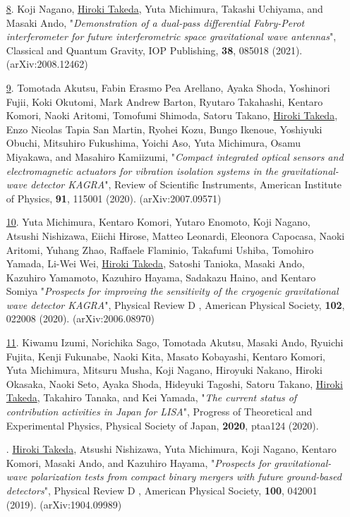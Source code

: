 \documentclass[uplatex, 12pt]{article}
\newcommand{\ctext}[1]{\ooalign{
\hfil\resizebox{\width}{\height}{#1}\hfil
\crcr
\raise.2mm\hbox{\large$\bigcirc$}}}
\begin{document}
\begin{enumerate}
\item[\uline{8}.] Koji Nagano, \uline{Hiroki Takeda}, Yuta Michimura, Takashi Uchiyama, and Masaki Ando, "\emph{Demonstration of a dual-pass differential Fabry-Perot interferometer for future interferometric space gravitational wave antennas}", Classical and Quantum Gravity, IOP Publishing, {\bf 38}, 085018 (2021). (arXiv:2008.12462)\\
  
\item[\uline{9}.] Tomotada Akutsu, Fabin Erasmo Pea Arellano, Ayaka Shoda, Yoshinori Fujii, Koki Okutomi, Mark Andrew Barton, Ryutaro Takahashi, Kentaro Komori, Naoki Aritomi, Tomofumi Shimoda, Satoru Takano, \uline{Hiroki Takeda}, Enzo Nicolas Tapia San Martin, Ryohei Kozu, Bungo Ikenoue, Yoshiyuki Obuchi, Mitsuhiro Fukushima, Yoichi Aso, Yuta Michimura, Osamu Miyakawa, and Masahiro Kamiizumi, "\emph{Compact integrated optical sensors and electromagnetic actuators for vibration isolation systems in the gravitational-wave detector KAGRA}", Review of Scientific Instruments, American Institute of Physics, {\bf 91}, 115001 (2020). (arXiv:2007.09571)\\

\item[\uline{10}.] Yuta Michimura, Kentaro Komori, Yutaro Enomoto, Koji Nagano, Atsushi Nishizawa, Eiichi Hirose, Matteo Leonardi, Eleonora Capocasa, Naoki Aritomi, Yuhang Zhao, Raffaele Flaminio, Takafumi Ushiba, Tomohiro Yamada, Li-Wei Wei, \uline{Hiroki Takeda}, Satoshi Tanioka, Masaki Ando, Kazuhiro Yamamoto, Kazuhiro Hayama, Sadakazu Haino, and Kentaro Somiya "\emph{Prospects for improving the sensitivity of the cryogenic gravitational wave detector KAGRA}", Physical Review D , American Physical Society, {\bf 102}, 022008 (2020). (arXiv:2006.08970)\\

\item[\uline{11}.] Kiwamu Izumi, Norichika Sago, Tomotada Akutsu, Masaki Ando, Ryuichi Fujita, Kenji Fukunabe, Naoki Kita, Masato Kobayashi, Kentaro Komori, Yuta Michimura, Mitsuru Musha, Koji Nagano, Hiroyuki Nakano, Hiroki Okasaka, Naoki Seto, Ayaka Shoda, Hideyuki Tagoshi, Satoru Takano, \uline{Hiroki Takeda}, Takahiro Tanaka, and Kei Yamada, "\emph{The current status of contribution activities in Japan for LISA}", Progress of Theoretical and Experimental Physics, Physical Society of Japan, {\bf 2020}, ptaa124 (2020).\\

\item[\uline{\ctext{12}}.] \uline{Hiroki Takeda}, Atsushi Nishizawa, Yuta Michimura, Koji Nagano, Kentaro Komori, Masaki Ando, and Kazuhiro Hayama, "\emph{Prospects for gravitational-wave polarization tests from compact binary mergers with future ground-based detectors}", Physical Review D , American Physical Society, {\bf 100}, 042001 (2019). (arXiv:1904.09989)\\


\end{enumerate}
\end{document}
